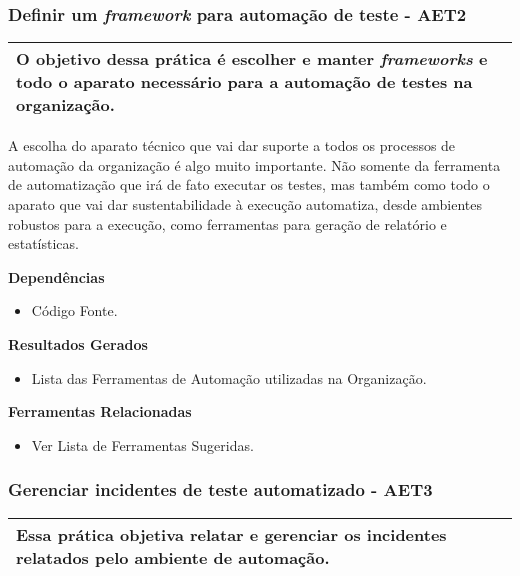 \subsubsection{ Definir um \textit{framework} para automação de teste - AET2}
\label{sec:aet2}

\begin{table}[H]
\centering
\begin{tabular}{|p{130mm}|}
\hline
O objetivo dessa prática é escolher e manter \textit{frameworks} e todo o aparato necessário para a automação de testes na organização. \\ 
\hline
\end{tabular}
\end{table}

A escolha do aparato técnico que vai dar suporte a todos os processos de automação da organização é algo muito importante. Não somente da ferramenta de automatização que irá de fato executar os testes, mas também como todo o aparato que vai dar sustentabilidade à execução automatiza, desde ambientes robustos para a execução, como ferramentas para geração de relatório e estatísticas.

\textbf{Dependências}
\begin{itemize}
    \item Código Fonte.
\end{itemize}

\textbf{Resultados Gerados}
\begin{itemize}
    \item Lista das Ferramentas de Automação utilizadas na Organização.
\end{itemize}

\textbf{Ferramentas Relacionadas}
\begin{itemize}
    \item Ver Lista de Ferramentas Sugeridas.
\end{itemize}


\subsubsection{ Gerenciar incidentes de teste automatizado - AET3}
\label{sec:aet3}

\begin{table}[!ht]
\centering
\begin{tabular}{|p{130mm}|}
\hline
Essa prática objetiva relatar e gerenciar os incidentes relatados pelo ambiente de automação. \\ 
\hline
\end{tabular}
\end{table}

